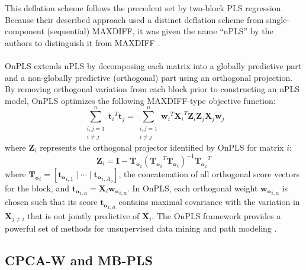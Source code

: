 \begin{doublespace}
This deflation scheme follows the precedent set by two-block PLS regression.
Because their described approach used a distinct deflation scheme from
single-component (sequential) MAXDIFF, it was given the name ``nPLS'' by
the authors to distinguish it from MAXDIFF
\cite{lofstedt:jchemo2011,lofstedt2012}.
\\\\
OnPLS extends nPLS by decomposing each matrix into a globally predictive
part and a non-globally predictive (orthogonal) part using an orthogonal
projection. By removing orthogonal variation from each block prior to
constructing an nPLS model, OnPLS optimizes the following MAXDIFF-type
objective function:
\begin{equation}
\sum_{\substack{i,j=1\\ i \ne j}}^n
 {\mathbf{t}_i}^T \mathbf{t}_j =
\sum_{\substack{i,j=1\\ i \ne j}}^n
 {\mathbf{w}_i}^T {\mathbf{X}_i}^T \mathbf{Z}_i
  \mathbf{Z}_j \mathbf{X}_j \mathbf{w}_j
\end{equation}
where $\mathbf{Z}_i$ represents the orthogonal projector identified by
OnPLS for matrix $i$:
\begin{equation*}
\mathbf{Z}_i = \mathbf{I} - \mathbf{T_o}_i \left(
  {\mathbf{T_o}_i}^T \mathbf{T_o}_i
 \right)^{-1} {\mathbf{T_o}_i}^T
\end{equation*}
where
$\mathbf{T_o}_i = [\mathbf{t_o}_{i,1}\mid\cdots\mid\mathbf{t_o}_{i,A_o}]$,
the concatenation of all orthogonal score vectors for the block, and
$\mathbf{t_o}_{i,a} = \mathbf{X}_i \mathbf{w_o}_{i,a}$. In OnPLS, each
orthogonal weight $\mathbf{w_o}_{i,a}$ is chosen such that its score
$\mathbf{t_o}_{i,a}$ contains maximal covariance with the variation in
$\mathbf{X}_{j \ne i}$ that is not jointly predictive of $\mathbf{X}_i$.
The OnPLS framework provides a powerful set of methods for unsupervised
data mining and path modeling \cite{lofstedt:jchemo2011,lofstedt:jchemo2012,
  lofstedt:cils2012,lofstedt:aca2013}.
\end{doublespace}

\subsection{CPCA-W and MB-PLS}

